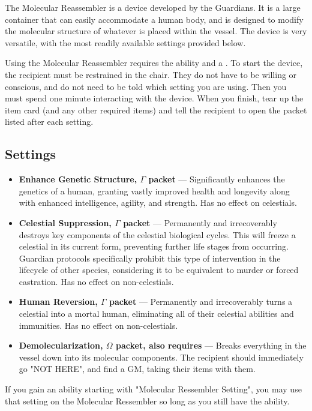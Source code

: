 \documentclass[green]{guardians}
\begin{document}
\name{\gReassembler{}}

The Molecular Reassembler is a device developed by the Guardians. It is a large container that can easily accommodate a human body, and is designed to modify the molecular structure of whatever is placed within the vessel. The device is very versatile, with the most readily available settings provided below.

Using the Molecular Reassembler requires the \aGuardianTech{} ability and a \iCoil{}. To start the device, the recipient must be restrained in the chair. They do not have to be willing or conscious, and do not need to be told which setting you are using. Then you must spend one minute interacting with the device. When you finish, tear up the \iCoil{} item card (and any other required items) and tell the recipient to open the packet listed after each setting.

\subsection{Settings}

\begin{itemize}
  \item \textbf{Enhance Genetic Structure, $\Gamma$ packet} --- Significantly enhances the genetics of a human, granting vastly improved health and longevity along with enhanced intelligence, agility, and strength. Has no effect on celestials.
  \item \textbf{Celestial Suppression, $\Gamma$ packet} --- Permanently and irrecoverably destroys key components of the celestial biological cycles. This will freeze a celestial in its current form, preventing further life stages from occurring. Guardian protocols specifically prohibit this type of intervention in the lifecycle of other species, considering it to be equivalent to murder or forced castration. Has no effect on non-celestials.
	\item \textbf{Human Reversion, $\Gamma$ packet} --- Permanently and irrecoverably turns a celestial into a mortal human, eliminating all of their celestial abilities and immunities. Has no effect on non-celestials.
	\item \textbf{Demolecularization, $\Omega$ packet, also requires \iMagnetite{}} --- Breaks everything in the vessel down into its molecular components. The recipient should immediately go "NOT HERE", and find a GM, taking their items with them.
	
\end{itemize}

If you gain an ability starting with "Molecular Ressembler Setting", you may use that setting on the Molecular Ressembler so long as you still have the \aGuardianTech{} ability.
\end{document}
